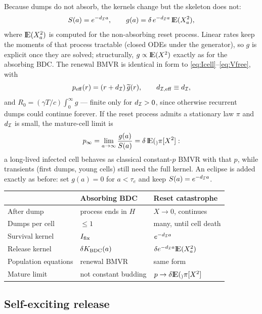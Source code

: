Because dumps do not absorb, the kernels change but the skeleton does not:
\begin{equation}
S(a)=e^{-d_{\mathcal{I}}a},
\qquad
g(a)=\delta\,e^{-d_{\mathcal{I}}a}\,{\rm I}\!{\rm E}(X_a^2),
\end{equation}
where ${\rm I}\!{\rm E}(X_a^2)$ is computed for the non-absorbing reset process.
Linear rates keep the moments of that process tractable (closed ODEs under
the generator), so $g$ is explicit once they are solved; structurally,
$g\propto{\rm I}\!{\rm E}(X^2)$ exactly as for the absorbing BDC. The renewal BMVR is
identical in form to \eqref{eq:Icell}--\eqref{eq:Vfree}, with
\begin{equation}
p_{\rm eff}(r)=\left( r+d_{\mathcal{I}}\right)\widetilde{g}(r),
\qquad
d_{\mathcal{I},{\rm eff}}\equiv d_{\mathcal{I}},
\end{equation}
and $R_0=(\gamma T/c)\int_0^\infty g$ --- finite only for $d_{\mathcal{I}}>0$,
since otherwise recurrent dumps could continue forever. If the reset process
admits a stationary law $\pi$ and $d_{\mathcal{I}}$ is small, the mature-cell
limit is
\begin{equation}
p_\infty=\lim_{a\to\infty}\frac{g(a)}{S(a)}=\delta\,{\rm I}\!{\rm E}(_)\pi[X^2]:
\end{equation}
a long-lived infected cell behaves as classical constant-$p$ BMVR with that
$p$, while transients (first dumps, young cells) still need the full kernel.
An eclipse is added exactly as before: set $g(a)=0$ for $a<\tau_e$ and keep
$S(a)=e^{-d_{\mathcal{I}}a}$.

\begin{center}
\renewcommand{\arraystretch}{1.2}
\small
\begin{tabular}{@{}lll@{}}
\toprule
 & Absorbing BDC & Reset catastrophe \\
\midrule
After dump & process ends in $H$ & $X\to0$, continues \\
Dumps per cell & $\le1$ & many, until cell death \\
Survival kernel & $I_{\mathrm{fix}}$ & $e^{-d_{\mathcal{I}}a}$ \\
Release kernel & $\delta K_{\rm BDC}(a)$ & $\delta e^{-d_{\mathcal{I}}a}{\rm I}\!{\rm E}(X_a^2)$ \\
Population equations & renewal BMVR & same form \\
Mature limit & not constant budding & $p\to\delta{\rm I}\!{\rm E}(_)\pi[X^2]$ \\
\bottomrule
\end{tabular}
\end{center}

\subsection{Self-exciting release}
\label{sec:self-excite}

